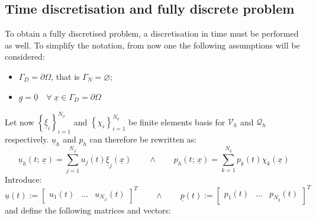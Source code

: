 \documentclass[11pt,a4paper]{article}
\renewcommand{\vec}[1]{\underline{#1}} %
\let\oldforall\forall
\renewcommand{\forall}{\oldforall \; }
\begin{document}
\subsection{Time discretisation and fully discrete problem}
To obtain a fully discretised problem, a discretisation in time must be performed as well. To simplify the notation, from now one the following assumptions will be considered: 
\begin{itemize}
    \item $\Gamma_{D} = \partial \Omega$, that is $\Gamma_{N} = \varnothing$;
    \item $\vec{g} = \vec{0} \quad \forall \vec{x} \in \Gamma_{D} = \partial \Omega$
\end{itemize}
Let now $\displaystyle \left\{ \vec{\xi}_{i} \right\}_{i = 1}^{N_{\varphi}}$ and $\displaystyle \left\{ \chi_{i} \right\}_{i = 1}^{N_{q}}$ be finite elements basis for $\mathcal{V}_{h}$ and $\mathcal{Q}_{h}$ respectively. $\vec{u}_{h}$ and $p_{h}$ can therefore be rewritten as: 
\begin{equation*}
    \vec{u}_{h} (t; \, \vec{x}) = \sum_{j = 1}^{N_{\varphi}} u_{j}(t) \vec{\xi}_{j}(\vec{x}) \qquad \wedge \qquad p_{h}(t; \, \vec{x}) = \sum_{k = 1}^{N_{q}} p_{k}(t) \chi_{k}(\vec{x})
\end{equation*}
Introduce: 
\begin{equation*}
    \vec{u}(t) := \begin{bmatrix}
        u_{1}(t) & ... & u_{N_{\varphi}}(t)
    \end{bmatrix}^{T} \qquad \wedge \qquad \vec{p}(t) := \begin{bmatrix}
        p_{1}(t) & ... & p_{N_{q}}(t)
    \end{bmatrix}^{T}
\end{equation*}
and define the following matrices and vectors: 
\end{document}
